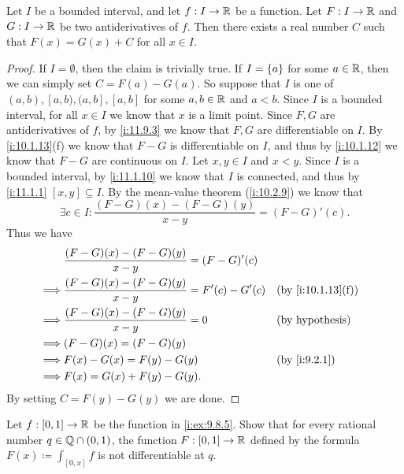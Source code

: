 \begin{lem}\label{i:11.9.5}
  Let \(I\) be a bounded interval, and let \(f : I \to \mathbb{R}\) be a function.
  Let \(F : I \to \mathbb{R}\) and \(G : I \to \mathbb{R}\) be two antiderivatives of \(f\).
  Then there exists a real number \(C\) such that \(F(x) = G(x) + C\) for all \(x \in I\).
\end{lem}

\begin{proof}
  If \(I = \emptyset\), then the claim is trivially true.
  If \(I = \left\lbrace a\right\rbrace\) for some \(a \in \mathbb{R}\), then we can simply set \(C = F(a) - G(a)\).
  So suppose that \(I\) is one of \((a, b), [a, b), (a, b], [a, b]\) for some \(a, b \in \mathbb{R}\) and \(a < b\).
  Since \(I\) is a bounded interval, for all \(x \in I\) we know that \(x\) is a limit point.
  Since \(F, G\) are antiderivatives of \(f\), by \cref{i:11.9.3} we know that \(F, G\) are differentiable on \(I\).
  By \cref{i:10.1.13}(f) we know that \(F - G\) is differentiable on \(I\), and thus by \cref{i:10.1.12} we know that \(F - G\) are continuous on \(I\).
  Let \(x, y \in I\) and \(x < y\).
  Since \(I\) is a bounded interval, by \cref{i:11.1.10} we know that \(I\) is connected, and thus by \cref{i:11.1.1} \([x, y] \subseteq I\).
  By the mean-value theorem (\cref{i:10.2.9}) we know that
  \[
    \exists c \in I : \dfrac{(F - G)(x) - (F - G)(y)}{x - y} = (F - G)'(c).
  \]
  Thus we have
  \begin{align*}
             & \dfrac{(F - G)(x) - (F - G)(y)}{x - y} = (F - G)'(c)                               \\
    \implies & \dfrac{(F - G)(x) - (F - G)(y)}{x - y} = F'(c) - G'(c) &  & \by{i:10.1.13}[f]      \\
    \implies & \dfrac{(F - G)(x) - (F - G)(y)}{x - y} = 0             &  & \text{(by hypothesis)} \\
    \implies & (F - G)(x) = (F - G)(y)                                                            \\
    \implies & F(x) - G(x) = F(y) - G(y)                              &  & \by{i:9.2.1}           \\
    \implies & F(x) = G(x) + F(y) - G(y).
  \end{align*}
  By setting \(C = F(y) - G(y)\) we are done.
\end{proof}

\exercisesection

\begin{ex}\label{i:ex:11.9.1}
  Let \(f : [0, 1] \to \mathbb{R}\) be the function in \cref{i:ex:9.8.5}.
  Show that for every rational number \(q \in \mathbb{Q} \cap (0, 1)\), the function \(F : [0, 1] \to \mathbb{R}\) defined by the formula \(F(x) \coloneqq \int_{[0, x]} f\) is not differentiable at \(q\).
\end{ex}

